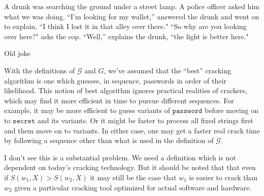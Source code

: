\documentclass[12pt]{article}
\newcommand\pwd[1]{\ensuremath{\mathtt{#1}}}
\newcommand\G{\ensuremath{\mathcal{G}}}
\begin{document}
\epigraph{A drunk was searching the ground under a street lamp. A police officer asked him what we was doing. ``I'm looking for my wallet,'' answered the drunk and went on to explain, ``I think I lost it in that alley over there."  ``So why are you looking over here?" asks the cop. ``Well,'' explains the drunk, ``the light is better here."}{Old joke} 

With the definitions of $\G$ and $G$, we've assumed that the ``best'' cracking algorithm is one which guesses, in sequence, passwords in order of their likelihood. This notion of best algorithm ignores practical realities of crackers, which may find it more efficient in time to pursue different sequences.  For example, it may be more efficient to guess variants of \pwd{password} before moving on to \pwd{secret} and its variants. Or it might be faster to process all fixed strings first and them move on to variants. In either case, one may get a faster real crack time by following a sequence other than what is used in the definition of $\G$.

I don't see this is a substantial problem. We need a definition which is not dependent on today's cracking technology. But it should be noted that that even if $S(w_1, X) > S(w_2, X)$ it may still be the case that $w_1$ is easier to crack than $w_2$ given a particular cracking tool optimized for actual software and hardware.















\newpage
\printbibliography
\end{document}
